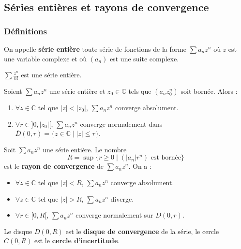 




  \subsection{Séries entières et rayons de convergence}

  \subsubsection{Définitions}


  \begin{definition}
    On appelle \textbf{série entière} toute série de fonctions de la forme $\sum a_n z^n$ où $z$ est une variable complexe et où $(a_n)$ est une suite complexe.
  \end{definition}

  \begin{example}
    $\sum \frac{z^n}{n!}$ est une série entière.
  \end{example}

  \begin{lemma}
    Soient $\sum a_n z^n$ une série entière et $z_0 \in \mathbb{C}$ tels que $(a_n z_0^n)$ soit bornée. Alors :
    \begin{enumerate}[label={\bfseries(\roman*)}]
      \item $\forall z \in \mathbb{C}$ tel que $|z| < |z_0|$, $\sum a_n z^n$ converge absolument.
      \item $\forall r \in ]0,|z_0|[, \, \sum a_n z^n$ converge normalement dans $\overline{D}(0, r) = \{ z \in \mathbb{C} \mid |z| \leq r \}$.
    \end{enumerate}
  \end{lemma}

  \begin{definition}
    Soit $\sum a_n z^n$ une série entière. Le nombre
    \[ R = \sup \{ r \geq 0 \mid (|a_n|r^n) \text{ est bornée} \} \]
    est le \textbf{rayon de convergence} de $\sum a_n z^n$. On a :
    \begin{itemize}
      \item $\forall z \in \mathbb{C}$ tel que $|z| < R$, $\sum a_n z^n$ converge absolument.
      \item $\forall z \in \mathbb{C}$ tel que $|z| > R$, $\sum a_n z^n$ diverge.
      \item $\forall r \in [0,R[$, $\sum a_n z^n$ converge normalement sur $\overline{D}(0,r)$.
    \end{itemize}
    Le disque $D(0,R)$ est le \textbf{disque de convergence} de la série, le cercle $C(0,R)$ est le \textbf{cercle d'incertitude}.
  \end{definition}

